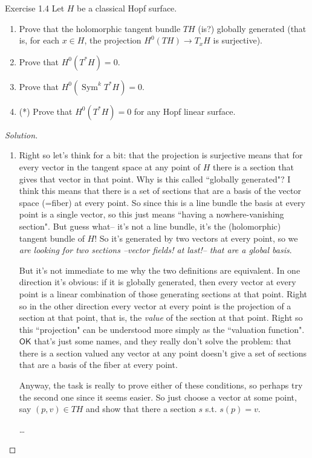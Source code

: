 \begin{thing4}{Exercise 1.4}\label{exer:1.4}\leavevmode
Let \(H\) be a classical Hopf surface.
\begin{enumerate}[label=(\alph*)]
\item Prove that the holomorphic tangent bundle \(TH\) {\color{4}(is?)} globally generated (that is, for each \(x \in H\), the projection \(H^{0}(TH)\longrightarrow T_xH\) is surjective).
 \item Prove that \(H^{0}(T^*H)=0\).
\item Prove that \(H^{0}(\operatorname{Sym}^k T^* H)=0\).
\item (*) Prove that \(H^{0}(T^*H)=0\) for any Hopf linear surface.
\end{enumerate}
\end{thing4}

\begin{proof}[Solution]\leavevmode
\begin{enumerate}[label=(\alph*)]
\item Right so let's think for a bit: that the projection is surjective means that for every vector in the tangent space at any point of \(H\) there is a section that gives that vector in that point. {\color{6}Why is this called ``globally generated"? I think this means that there is a set of sections that are a basis of the vector space (=fiber) at every point. So since this is a line bundle the basis at every point is a single vector, so this just means ``having a nowhere-vanishing section"}. But guess what-- it's not a line bundle, it's the (holomorphic) tangent bundle of \(H\)! So it's generated by two vectors at every point, so we \textit{are looking for two sections --vector fields! at last!-- that are a global basis}.

	But it's not immediate to me why the two definitions are equivalent. In one direction it's obvious: if it is globally generated, then every vector at every point is a linear combination of those generating sections at that point. Right so in the other direction every vector at every point is the projection of a section at that point, that is, the \textit{value} of the section at that point. Right so this ``projection" can be understood more simply as the ``valuation function". $\mathsf{OK}$ that's just some names, and they really don't solve the problem: that there is a section valued any vector at any point doesn't give a set of sections that are a basis of the fiber at every point.

Anyway, the task is really to prove either of these conditions, so perhaps try the second one since it seems easier. So just choose a vector at some point, say \((p,v) \in TH\) and show that there a section \(s\) s.t. \(s(p)=v\).

{\color{2}…}
\end{enumerate}
\end{proof}


